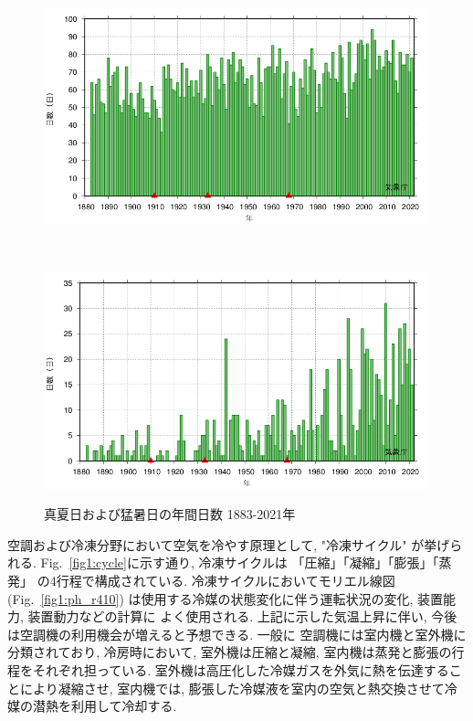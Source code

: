 \documentclass[a4j,fleqn,dvipdfmx,uplatex]{jsarticle}
\newcommand{\figref}[1]{Fig.\ \ref{#1}}
\begin{document}
\begin{figure}[hhtb]
  \centering
  \begin{minipage}[b]{\linewidth}
      \centering
      \includegraphics[width=\linewidth]{img/OSAKA_tmaxGE30.png}
      \label{subfig1:temp_osaka}
    \end{minipage}\\
    \begin{minipage}[b]{\linewidth}
      \centering
      \includegraphics[width=\linewidth]{img/OSAKA_tmaxGE35.png}
      \label{subfig1:temp_osaka2}
    \end{minipage}
    \caption{真夏日および猛暑日の年間日数 1883-2021年\cite{temp_osaka3}}
    \label{fig1:temp_osaka}
\end{figure}
 

空調および冷凍分野において空気を冷やす原理として, "冷凍サイクル" が挙げられる. 
\figref{fig1:cycle}に示す通り, 冷凍サイクルは 「圧縮」「凝縮」「膨張」「蒸発」 
の4行程で構成されている. 冷凍サイクルにおいてモリエル線図(\figref{fig1:ph_r410}) 
は使用する冷媒の状態変化に伴う運転状況の変化, 装置能力, 装置動力などの計算に
よく使用される. 
上記に示した気温上昇に伴い, 今後は空調機の利用機会が増えると予想できる. 一般に
空調機には室内機と室外機に分類されており, 
冷房時において, 室外機は圧縮と凝縮, 室内機は蒸発と膨張の行程をそれぞれ担っている. 
室外機は高圧化した冷媒ガスを外気に熱を伝達することにより凝縮させ, 
室内機では, 膨張した冷媒液を室内の空気と熱交換させて冷媒の潜熱を利用して冷却する. 
\end{document}

